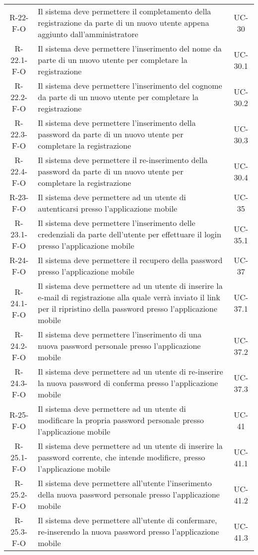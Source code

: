 \begin{longtable}{ c C{9.5cm} c }
    R-22-F-O & Il sistema deve permettere il completamento della registrazione da parte di un nuovo utente appena aggiunto dall'amministratore& UC- 30\\
    R-22.1-F-O & Il sistema deve permettere l'inserimento del nome da parte di un nuovo utente per completare la registrazione& UC- 30.1\\
    R-22.2-F-O & Il sistema deve permettere l'inserimento del cognome da parte di un nuovo utente per completare la registrazione& UC- 30.2\\
    R-22.3-F-O & Il sistema deve permettere l'inserimento della password da parte di un nuovo utente per completare la registrazione& UC- 30.3\\
    R-22.4-F-O & Il sistema deve permettere il re-inserimento della password da parte di un nuovo utente per completare la registrazione& UC- 30.4\\
    R-23-F-O & Il sistema deve permettere ad un utente di autenticarsi presso l'applicazione mobile& UC-35\\
    R-23.1-F-O & Il sistema deve permettere l'inserimento delle credenziali da parte dell'utente per effettuare il login presso l'applicazione mobile& UC-35.1\\
    R-24-F-O & Il sistema deve permettere il recupero della password presso l'applicazione mobile& UC-37\\
    R-24.1-F-O & Il sistema deve permettere ad un utente di inserire la e-mail di registrazione alla quale verrà inviato il link per il ripristino della password presso l'applicazione mobile& UC-37.1\\
    R-24.2-F-O & Il sistema deve permettere l'inserimento di una nuova password personale presso l'applicazione mobile& UC-37.2\\
    R-24.3-F-O & Il sistema deve permettere ad un utente di re-inserire la nuova password di conferma presso l'applicazione mobile& UC-37.3\\
    R-25-F-O & Il sistema deve permettere ad un utente di modificare la propria password personale presso l'applicazione mobile& UC-41\\
    R-25.1-F-O & Il sistema deve permettere ad un utente di inserire la password corrente, che intende modificre, presso l'applicazione mobile& UC-41.1\\
    R-25.2-F-O & Il sistema deve permettere all'utente l'inserimento della nuova password personale presso l'applicazione mobile& UC-41.2\\
    R-25.3-F-O & Il sistema deve permettere all'utente di confermare, re-inserendo la nuova password presso l'applicazione mobile& UC-41.3\\

\end{longtable}
